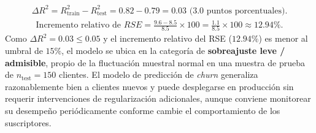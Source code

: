 \begin{solproblema}[prob:9689172]
	\begin{align}
		\Delta R^2 = R_{\text{train}}^2 - R_{\text{test}}^2 = 0.82-0.79 = 0.03 \text{ (3.0 puntos porcentuales).}
	\end{align}
	\begin{align}
		\text{Incremento relativo de } RSE = \frac{9.6-8.5}{8.5}\times100 = \frac{1.1}{8.5}\times100 \approx 12.94\%.
	\end{align}
	Como $\Delta R^2 = 0.03 \le 0.05$ y el incremento relativo del RSE ($12.94\%$) es menor al umbral de $15\%$, el modelo se ubica en la categoría de \textbf{sobreajuste leve / admisible}, propio de la fluctuación muestral normal en una muestra de prueba de $n_{\text{test}}=150$ clientes. El modelo de predicción de \emph{churn} generaliza razonablemente bien a clientes nuevos y puede desplegarse en producción sin requerir intervenciones de regularización adicionales, aunque conviene monitorear su desempeño periódicamente conforme cambie el comportamiento de los suscriptores.
\end{solproblema}
